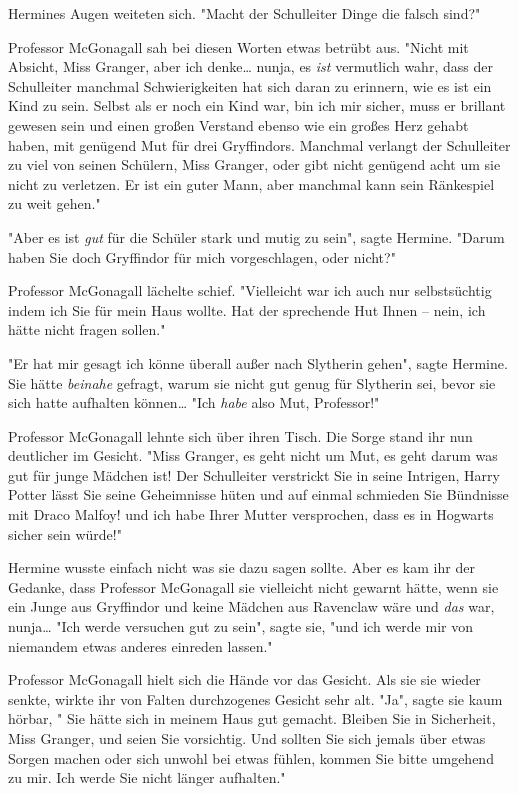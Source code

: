 {Hermines Augen weiteten sich. "Macht der Schulleiter Dinge die falsch sind?"

Professor McGonagall sah bei diesen Worten etwas betrübt aus. "Nicht mit Absicht, Miss Granger, aber ich denke… nunja, es \emph{ist} vermutlich wahr, dass der Schulleiter manchmal Schwierigkeiten hat sich daran zu erinnern, wie es ist ein Kind zu sein. Selbst als er noch ein Kind war, bin ich mir sicher, muss er brillant gewesen sein und einen großen Verstand ebenso wie ein großes Herz gehabt haben, mit genügend Mut für drei Gryffindors. Manchmal verlangt der Schulleiter zu viel von seinen Schülern, Miss Granger, oder gibt nicht genügend acht um sie nicht zu verletzen. Er ist ein guter Mann, aber manchmal kann sein Ränkespiel zu weit gehen."

"Aber es ist \emph{gut} für die Schüler stark und mutig zu sein", sagte Hermine. "Darum haben Sie doch Gryffindor für mich vorgeschlagen, oder nicht?"

Professor McGonagall lächelte schief. "Vielleicht war ich auch nur selbstsüchtig indem ich Sie für mein Haus wollte. Hat der sprechende Hut Ihnen -- nein, ich hätte nicht fragen sollen."

"Er hat mir gesagt ich könne überall außer nach Slytherin gehen", sagte Hermine. Sie hätte \emph{beinahe} gefragt, warum sie nicht gut genug für Slytherin sei, bevor sie sich hatte aufhalten können… "Ich \emph{habe} also Mut, Professor!"

Professor McGonagall lehnte sich über ihren Tisch. Die Sorge stand ihr nun deutlicher im Gesicht. "Miss Granger, es geht nicht um Mut, es geht darum was gut für junge Mädchen ist! Der Schulleiter verstrickt Sie in seine Intrigen, Harry Potter lässt Sie seine Geheimnisse hüten und auf einmal schmieden Sie Bündnisse mit Draco Malfoy! und ich habe Ihrer Mutter versprochen, dass es in Hogwarts sicher sein würde!"

Hermine wusste einfach nicht was sie dazu sagen sollte. Aber es kam ihr der Gedanke, dass Professor McGonagall sie vielleicht nicht gewarnt hätte, wenn sie ein Junge aus Gryffindor und keine Mädchen aus Ravenclaw wäre und \emph{das} war, nunja… "Ich werde versuchen gut zu sein", sagte sie, "und ich werde mir von niemandem etwas anderes einreden lassen."

Professor McGonagall hielt sich die Hände vor das Gesicht. Als sie sie wieder senkte, wirkte ihr von Falten durchzogenes Gesicht sehr alt. "Ja", sagte sie kaum hörbar, " Sie hätte sich in meinem Haus gut gemacht. Bleiben Sie in Sicherheit, Miss Granger, und seien Sie vorsichtig. Und sollten Sie sich jemals über etwas Sorgen machen oder sich unwohl bei etwas fühlen, kommen Sie bitte umgehend zu mir. Ich werde Sie nicht länger aufhalten."

}
